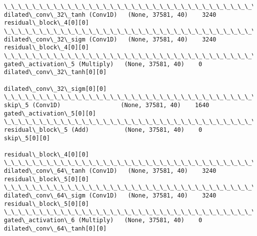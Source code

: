 \documentclass[11pt]{article}
\begin{document}
\begin{Verbatim}[commandchars=\\\{\}]
\_\_\_\_\_\_\_\_\_\_\_\_\_\_\_\_\_\_\_\_\_\_\_\_\_\_\_\_\_\_\_\_\_\_\_\_\_\_\_\_\_\_\_\_\_\_\_\_\_\_\_\_\_\_\_\_\_\_\_\_\_\_\_\_\_\_\_\_\_\_\_\_\_\_\_\_\_\_\_\_\_\_\_\_\_\_\_\_\_\_\_\_\_\_\_\_\_\_
dilated\_conv\_32\_tanh (Conv1D)   (None, 37581, 40)    3240        residual\_block\_4[0][0]           
\_\_\_\_\_\_\_\_\_\_\_\_\_\_\_\_\_\_\_\_\_\_\_\_\_\_\_\_\_\_\_\_\_\_\_\_\_\_\_\_\_\_\_\_\_\_\_\_\_\_\_\_\_\_\_\_\_\_\_\_\_\_\_\_\_\_\_\_\_\_\_\_\_\_\_\_\_\_\_\_\_\_\_\_\_\_\_\_\_\_\_\_\_\_\_\_\_\_
dilated\_conv\_32\_sigm (Conv1D)   (None, 37581, 40)    3240        residual\_block\_4[0][0]           
\_\_\_\_\_\_\_\_\_\_\_\_\_\_\_\_\_\_\_\_\_\_\_\_\_\_\_\_\_\_\_\_\_\_\_\_\_\_\_\_\_\_\_\_\_\_\_\_\_\_\_\_\_\_\_\_\_\_\_\_\_\_\_\_\_\_\_\_\_\_\_\_\_\_\_\_\_\_\_\_\_\_\_\_\_\_\_\_\_\_\_\_\_\_\_\_\_\_
gated\_activation\_5 (Multiply)   (None, 37581, 40)    0           dilated\_conv\_32\_tanh[0][0]       
                                                                 dilated\_conv\_32\_sigm[0][0]       
\_\_\_\_\_\_\_\_\_\_\_\_\_\_\_\_\_\_\_\_\_\_\_\_\_\_\_\_\_\_\_\_\_\_\_\_\_\_\_\_\_\_\_\_\_\_\_\_\_\_\_\_\_\_\_\_\_\_\_\_\_\_\_\_\_\_\_\_\_\_\_\_\_\_\_\_\_\_\_\_\_\_\_\_\_\_\_\_\_\_\_\_\_\_\_\_\_\_
skip\_5 (Conv1D)                 (None, 37581, 40)    1640        gated\_activation\_5[0][0]         
\_\_\_\_\_\_\_\_\_\_\_\_\_\_\_\_\_\_\_\_\_\_\_\_\_\_\_\_\_\_\_\_\_\_\_\_\_\_\_\_\_\_\_\_\_\_\_\_\_\_\_\_\_\_\_\_\_\_\_\_\_\_\_\_\_\_\_\_\_\_\_\_\_\_\_\_\_\_\_\_\_\_\_\_\_\_\_\_\_\_\_\_\_\_\_\_\_\_
residual\_block\_5 (Add)          (None, 37581, 40)    0           skip\_5[0][0]                     
                                                                 residual\_block\_4[0][0]           
\_\_\_\_\_\_\_\_\_\_\_\_\_\_\_\_\_\_\_\_\_\_\_\_\_\_\_\_\_\_\_\_\_\_\_\_\_\_\_\_\_\_\_\_\_\_\_\_\_\_\_\_\_\_\_\_\_\_\_\_\_\_\_\_\_\_\_\_\_\_\_\_\_\_\_\_\_\_\_\_\_\_\_\_\_\_\_\_\_\_\_\_\_\_\_\_\_\_
dilated\_conv\_64\_tanh (Conv1D)   (None, 37581, 40)    3240        residual\_block\_5[0][0]           
\_\_\_\_\_\_\_\_\_\_\_\_\_\_\_\_\_\_\_\_\_\_\_\_\_\_\_\_\_\_\_\_\_\_\_\_\_\_\_\_\_\_\_\_\_\_\_\_\_\_\_\_\_\_\_\_\_\_\_\_\_\_\_\_\_\_\_\_\_\_\_\_\_\_\_\_\_\_\_\_\_\_\_\_\_\_\_\_\_\_\_\_\_\_\_\_\_\_
dilated\_conv\_64\_sigm (Conv1D)   (None, 37581, 40)    3240        residual\_block\_5[0][0]           
\_\_\_\_\_\_\_\_\_\_\_\_\_\_\_\_\_\_\_\_\_\_\_\_\_\_\_\_\_\_\_\_\_\_\_\_\_\_\_\_\_\_\_\_\_\_\_\_\_\_\_\_\_\_\_\_\_\_\_\_\_\_\_\_\_\_\_\_\_\_\_\_\_\_\_\_\_\_\_\_\_\_\_\_\_\_\_\_\_\_\_\_\_\_\_\_\_\_
gated\_activation\_6 (Multiply)   (None, 37581, 40)    0           dilated\_conv\_64\_tanh[0][0]       

\end{Verbatim}
\end{document}
